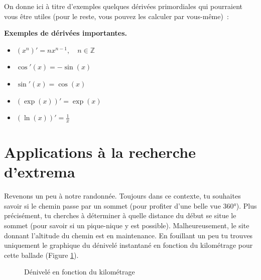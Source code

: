 On donne ici à titre d'exemples quelques dérivées primordiales qui pourraient vous être utiles (pour le reste, vous pouvez les calculer par vous-même)~:
\begin{greybox}
\textbf{Exemples de dérivées importantes.}
\begin{itemize}
    \item $\left( x^{n} \right)' = n x^{n-1} , \quad n \in \mathbb{Z}$
    \item $\cos'(x) = -\sin(x)$
    \item $\sin'(x) = \cos(x)$
    \item $\left( \exp(x) \right)' = \exp(x)$
    \item $\left( \ln(x) \right)' = \frac{1}{x}$
\end{itemize}
\end{greybox}

\section{Applications à la recherche d'extrema}

Revenons un peu à notre randonnée. Toujours dans ce contexte, tu souhaites savoir si le chemin passe par un sommet (pour profiter d'une belle vue 360°). Plus précisément, tu cherches à déterminer à quelle distance du début se situe le sommet (pour savoir si un pique-nique y est possible). Malheureusement, le site donnant l'altitude du chemin est en maintenance. En fouillant un peu tu trouves uniquement le graphique du dénivelé instantané en fonction du kilométrage pour cette ballade (Figure \ref{fig:differential_calculus_figure_plot_7}).

\begin{figure}[H]
    \centering
    \hfill
    \caption{Dénivelé en fonction du kilométrage}
    \label{fig:differential_calculus_figure_plot_7}
\end{figure}

